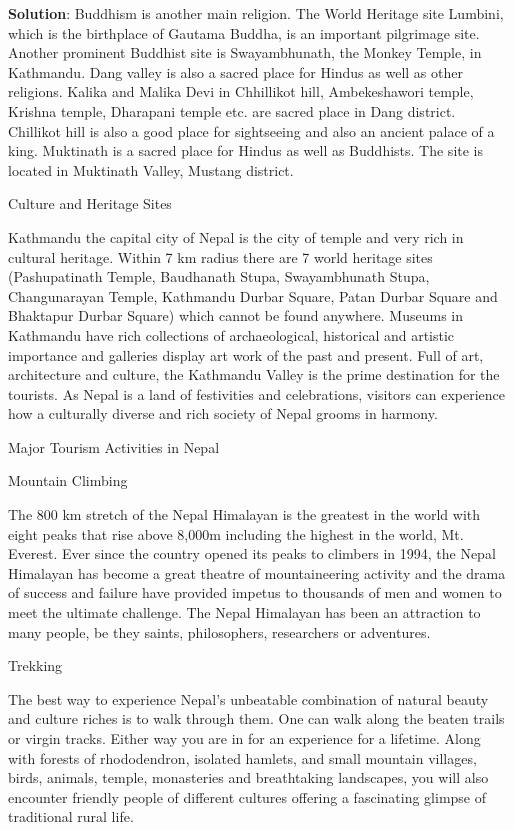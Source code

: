 \documentclass[
]{book}
\newenvironment{solution}{ {\bfseries Solution}:}{}
\begin{document}
\begin{questions}
\begin{solution}
Buddhism is another main religion. The World Heritage site Lumbini, which is the birthplace of Gautama Buddha, is an important pilgrimage site. Another prominent Buddhist site is Swayambhunath, the Monkey Temple, in Kathmandu. Dang valley is also a sacred place for Hindus as well as other religions. Kalika and Malika Devi in Chhillikot hill, Ambekeshawori temple, Krishna temple, Dharapani temple etc. are sacred place in Dang district. Chillikot hill is also a good place for sightseeing and also an ancient palace of a king. Muktinath is a sacred place for Hindus as well as Buddhists. The site is located in Muktinath Valley, Mustang district.

Culture and Heritage Sites

Kathmandu the capital city of Nepal is the city of temple and very rich in cultural heritage. Within 7 km radius there are 7 world heritage sites (Pashupatinath Temple, Baudhanath Stupa, Swayambhunath Stupa, Changunarayan Temple, Kathmandu Durbar Square, Patan Durbar Square and Bhaktapur Durbar Square) which cannot be found anywhere. Museums in Kathmandu have rich collections of archaeological, historical and artistic importance and galleries display art work of the past and present. Full of art, architecture and culture, the Kathmandu Valley is the prime destination for the tourists. As Nepal is a land of festivities and celebrations, visitors can experience how a culturally diverse and rich society of Nepal grooms in harmony.

Major Tourism Activities in Nepal

Mountain Climbing

The 800 km stretch of the Nepal Himalayan is the greatest in the world with eight peaks that rise above 8,000m including the highest in the world, Mt. Everest. Ever since the country opened its peaks to climbers in 1994, the Nepal Himalayan has become a great theatre of mountaineering activity and the drama of success and failure have provided impetus to thousands of men and women to meet the ultimate challenge. The Nepal Himalayan has been an attraction to many people, be they saints, philosophers, researchers or adventures.

Trekking

The best way to experience Nepal’s unbeatable combination of natural beauty and culture riches is to walk through them. One can walk along the beaten trails or virgin tracks. Either way you are in for an experience for a lifetime. Along with forests of rhododendron, isolated hamlets, and small mountain villages, birds, animals, temple, monasteries and breathtaking landscapes, you will also encounter friendly people of different cultures offering a fascinating glimpse of traditional rural life.


\end{solution}
\end{questions}
\end{document}
